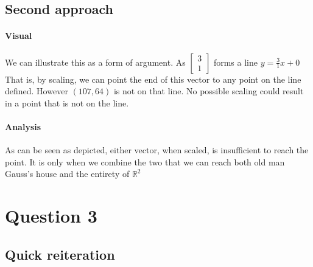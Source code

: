 \documentclass{article}
\begin{document}
    \subsection{Second approach}
    \paragraph{Visual}
        We can illustrate this as a form of argument. As $\begin{bmatrix}3 \\ 1\end{bmatrix}$ forms a line
        $y=\frac{3}{1}x+0$ That is, by scaling, we can point the end of this vector
        to any point on the line defined. However $(107, 64)$ is not on that line. No possible scaling
        could result in a point that is not on the line.
        \begin{center}
        \end{center}
    \paragraph{Analysis}
    As can be seen as depicted, either vector, when scaled, is insufficient
    to reach the point. It is only when we combine the two that we can reach
    both old man Gauss's house and the entirety of $\mathbb{R}^2$





\section{Question 3}
    \subsection{Quick reiteration}
\end{document}
